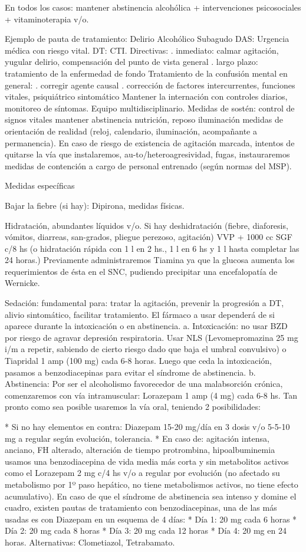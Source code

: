 \documentclass{scrbook}
\begin{document}
En todos los casos: mantener abstinencia alcohólica + intervenciones psicosociales + vitaminoterapia v/o.

Ejemplo de pauta de tratamiento: Delirio Alcohólico Subagudo DAS: Urgencia médica con riesgo vital. DT: CTI. Directivas: . inmediato: calmar agitación, yugular delirio, compensación del punto de vista general . largo plazo: tratamiento de la enfermedad de fondo Tratamiento de la confusión mental en general: . corregir agente causal . corrección de factores intercurrentes, funciones vitales, psiquiátrico sintomático Mantener la internación con controles diarios, monitoreo de síntomas. Equipo multidisciplinario. Medidas de sostén: control de signos vitales mantener abstinencia nutrición, reposo iluminación medidas de orientación de realidad (reloj, calendario, iluminación, acompañante a permanencia). En caso de riesgo de existencia de agitación marcada, intentos de quitarse la vía que instalaremos, au-to/heteroagresividad, fugas, instauraremos medidas de contención a cargo de personal entrenado (según normas del MSP).

Medidas específicas

Bajar la fiebre (si hay): Dipirona, medidas físicas.

Hidratación, abundantes líquidos v/o. Si hay deshidratación (fiebre, diaforesis, vómitos, diarreas, san-grados, pliegue perezoso, agitación) VVP + 1000 cc SGF c/8 hs (o hidratación rápida con 1 l en 2 hs., 1 l en 6 hs y 1 l hasta completar las 24 horas.) Previamente administraremos Tiamina ya que la glucosa aumenta los requerimientos de ésta en el SNC, pudiendo precipitar una encefalopatía de Wernicke.

Sedación: fundamental para: tratar la agitación, prevenir la progresión a DT, alivio sintomático, facilitar tratamiento. El fármaco a usar dependerá de si aparece durante la intoxicación o en abstinencia.
a. Intoxicación: no usar BZD por riesgo de agravar depresión respiratoria. Usar NLS (Levomepromazina 25 mg i/m a repetir, sabiendo de cierto riesgo dado que baja el umbral convulsivo) o Tiapridal 1 amp (100 mg) cada 6-8 horas. Luego que ceda la intoxicación, pasamos a benzodiacepinas para evitar el síndrome de abstinencia.
b. Abstinencia: Por ser el alcoholismo favorecedor de una malabsorción crónica, comenzaremos con vía intramuscular: Lorazepam 1 amp (4 mg) cada 6-8 hs. Tan pronto como sea posible usaremos la vía oral, teniendo 2 posibilidades:

* Si no hay elementos en contra: Diazepam 15-20 mg/día en 3 dosis v/o 5-5-10 mg a regular según evolución, tolerancia.
* En caso de: agitación intensa, anciano, FH alterado, alteración de tiempo protrombina, hipoalbuminemia usamos una benzodiacepina de vida media más corta y sin metabolitos activos como el Lorazepam 2 mg c/4 hs v/o a regular por evolución (no afectado su metabolismo por 1º paso hepático, no tiene metabolismos activos, no tiene efecto acumulativo). En caso de que el síndrome de abstinencia sea intenso y domine el cuadro, existen pautas de tratamiento con benzodiacepinas, una de las más usadas es con Diazepam en un esquema de 4 días:
* Día 1: 20 mg cada 6 horas
* Día 2: 20 mg cada 8 horas
* Día 3: 20 mg cada 12 horas
* Día 4: 20 mg en 24 horas.
Alternativas: Clometiazol, Tetrabamato.
\end{document}
